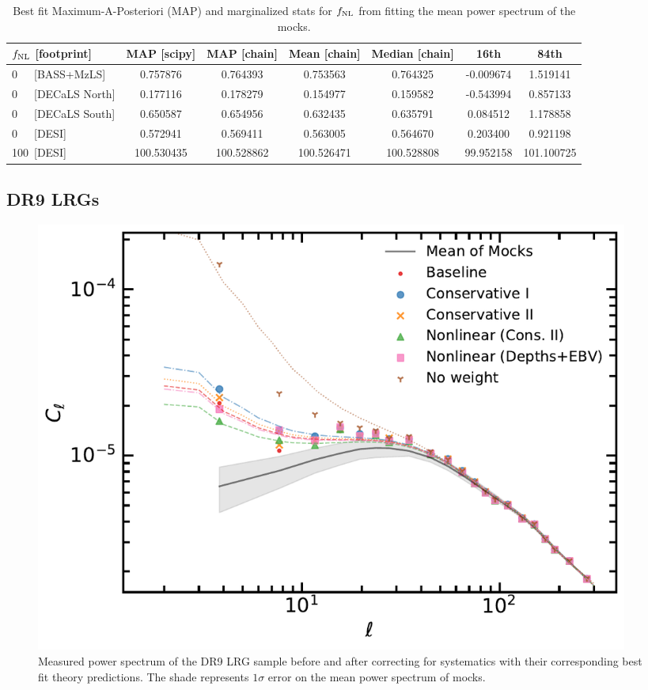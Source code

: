 \begin{table}
  \begin{center}
    \caption{Best fit Maximum-A-Posteriori (MAP) and marginalized stats for $f_{\rm NL}$ from fitting the mean power spectrum of the mocks.}
    \label{tab:mocksmcmc}
    \begin{tabular}{lcccccc}
    \hline
    \hline
   $f_{\rm NL}$ [footprint] & MAP [scipy] & MAP [chain]  &	Mean [chain]	& Median [chain] &	16th	& 84th \\
    \hline
	0~~~[BASS+MzLS]	&0.757876&	0.764393&	0.753563&	0.764325&	-0.009674&	1.519141 \\
	0~~~[DECaLS North]	&0.177116&	0.178279&	0.154977&	0.159582&	-0.543994&	0.857133\\
	0~~~[DECaLS South]&	0.650587&	0.654956&	0.632435&	0.635791&	0.084512&	1.178858 \\
	0~~~[DESI] & 0.572941	& 0.569411 &	0.563005&	0.564670&	0.203400&	0.921198 \\
	100~[DESI] & 100.530435	& 100.528862 &	100.526471&	100.528808&	99.952158&	101.100725 
    \end{tabular}
  \end{center}
\end{table}


\clearpage
\subsection{DR9 LRGs}
\begin{figure}
    \centering
    \includegraphics[width=0.95\textwidth]{figures/cl_obs.pdf} 
    \caption{Measured power spectrum of the DR9 LRG sample before and after correcting for systematics with their corresponding best fit theory predictions. The shade represents $1\sigma$ error on the mean power spectrum of mocks.}
    \label{fig:cl_dr9}
\end{figure}

